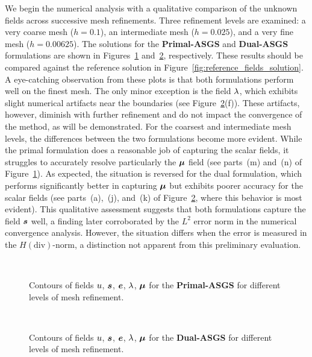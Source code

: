 We begin the numerical analysis with a qualitative comparison of the unknown fields across successive mesh refinements. Three refinement levels are examined: a very coarse mesh ($h = 0.1$), an intermediate mesh ($h = 0.025$), and a very fine mesh ($h = 0.00625$). The solutions for the \textbf{Primal-ASGS} and \textbf{Dual-ASGS} formulations are shown in Figures~\ref{fig:primal_formulation_fields_solution} and~\ref{fig:dual_formulation_fields_solution}, respectively. These results should be compared against the reference solution in Figure~\ref{fig:reference_fields_solution}.
A eye-catching observation from these plots is that both formulations perform well on the finest mesh. The only minor exception is the field $\lambda$, which exhibits slight numerical artifacts near the boundaries (see Figure~\ref{fig:dual_formulation_fields_solution}(f)). These artifacts, however, diminish with further refinement and do not impact the convergence of the method, as will be demonstrated. For the coarsest and intermediate mesh levels, the differences between the two formulations become more evident. While the primal formulation does a reasonable job of capturing the scalar fields, it struggles to accurately resolve particularly the $\bm{\mu}$ field (see parts~(m) and~(n) of Figure~\ref{fig:primal_formulation_fields_solution}). As expected, the situation is reversed for the dual formulation, which performs significantly better in capturing
$\bm{\mu}$ but exhibits poorer accuracy for the scalar fields (see parts~(a),~(j), and~(k) of Figure~\ref{fig:dual_formulation_fields_solution}, where this behavior is most evident).
This qualitative assessment suggests that both formulations capture the field $\bm{s}$ well, a finding later corroborated by the $L^2$ error norm in the numerical convergence analysis. However, the situation differs when the error is measured in the $H(\text{div})$-norm, a distinction not apparent from this preliminary evaluation.
\begin{figure}[ht!!]
	\centering
	\caption{Contours of fields $u$, $\bm{s}$, $\bm{e}$, $\lambda$, $\bm{\mu}$ 
	for the \textbf{Primal-ASGS} for different levels of mesh refinement.}
	~\\
	\def\svgwidth{0.7\columnwidth}
	
	\label{fig:primal_formulation_fields_solution}
\end{figure}

\begin{figure}[ht!!]
	\centering
	\caption{Contours of fields $u$, $\bm{s}$, $\bm{e}$, $\lambda$, $\bm{\mu}$ 
	for the \textbf{Dual-ASGS} for different levels of mesh refinement.}
	~\\
	\def\svgwidth{0.7\columnwidth}
	
	\label{fig:dual_formulation_fields_solution}
\end{figure}


